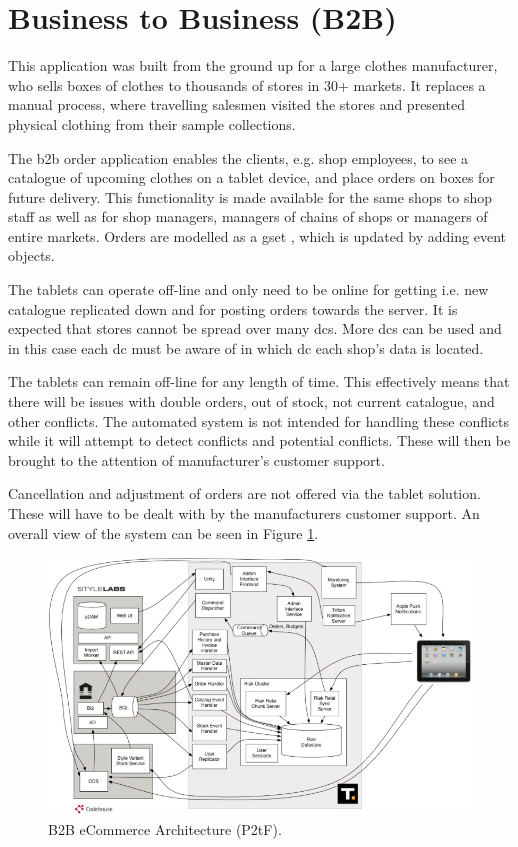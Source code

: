 \section{Business to Business (B2B)}
This application was built from the ground up for a large clothes manufacturer, who sells boxes of clothes to thousands of stores in 30+ markets. It replaces a manual process, where travelling salesmen visited the stores and presented physical clothing from their sample collections.

The \gls{b2b} order application enables the clients, e.g. shop employees, to see a catalogue of upcoming clothes on a tablet device, and place orders on boxes for future delivery. This functionality is made available for the same shops to shop staff as well as for shop managers, managers of chains of shops or managers of entire markets. Orders are modelled as a \gls{gset} \cite{shapiro11comprehensive}, which is updated by adding event objects.

The tablets can operate off-line and only need to be online for getting i.e. new catalogue replicated down and for posting orders towards the server. It is expected that stores cannot be spread over many \glspl{dc}. More \glspl{dc} can be used and in this case each \gls{dc} must be aware of in which \gls{dc} each shop's data is located.

The tablets can remain off-line for any length of time. This effectively means that there will be issues with double orders, out of stock, not current catalogue, and other conflicts. The automated system is not intended for handling these conflicts while it will attempt to detect conflicts and potential conflicts. These will then be brought to the attention of manufacturer's customer support.

Cancellation and adjustment of orders are not offered via the tablet solution. These will have to be dealt with by the manufacturers customer support. An overall view of the system can be seen in Figure \ref{fig:b2b_architecture}.
\begin{figure}[ht!]
	\centering
	\includegraphics[width=1\textwidth]{figures/b2b.png}
	
	\caption{B2B eCommerce Architecture (P2tF).}
	\label{fig:b2b_architecture}
\end{figure}
